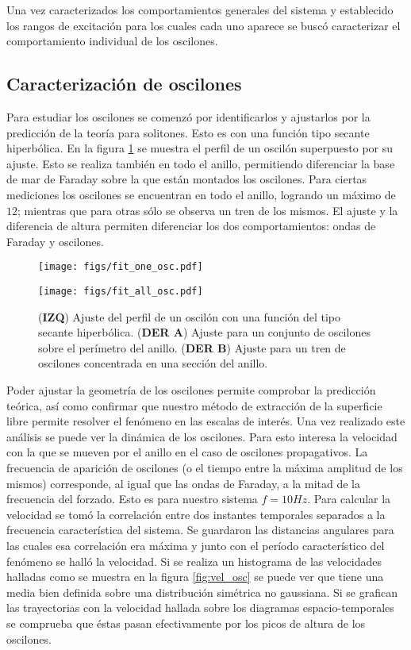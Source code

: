 \documentclass[../main.tex]{subfiles}
\begin{document}
Una vez caracterizados los comportamientos generales del sistema y establecido los rangos de excitación para los cuales cada uno aparece se buscó caracterizar el comportamiento individual de los oscilones. 

\subsection{Caracterización de oscilones}
Para estudiar los oscilones se comenzó por identificarlos y ajustarlos por la predicción de la teoría para solitones. Esto es con una función tipo secante hiperbólica. En la figura  \ref{fig:ajuste_osc} se muestra el perfil de un oscilón superpuesto por su ajuste. Esto se realiza también en todo el anillo, permitiendo diferenciar la base de mar de Faraday sobre la que están montados los oscilones. Para ciertas mediciones los oscilones se encuentran en todo el anillo, logrando un máximo de $12$; mientras que para otras sólo se observa un tren de los mismos. El ajuste y la diferencia de altura permiten diferenciar los dos comportamientos: ondas de Faraday y oscilones. 

\begin{figure}[H]
	\begin{minipage}{0.46\textwidth}
	    \texttt{[image: figs/fit\_one\_osc.pdf]}
	\end{minipage} \hfill
	\begin{minipage}{0.46\textwidth}
	    \texttt{[image: figs/fit\_all\_osc.pdf]}
	\end{minipage}
    \caption{(\textbf{IZQ}) Ajuste del perfil de un oscilón con una función del tipo secante hiperbólica. (\textbf{DER A}) Ajuste para un conjunto de oscilones sobre el perímetro del anillo. (\textbf{DER B}) Ajuste para un tren de oscilones concentrada en una sección del anillo.}
    \label{fig:ajuste_osc}
\end{figure}

Poder ajustar la geometría de los oscilones permite comprobar la predicción teórica, así como confirmar que nuestro método de extracción de la superficie libre permite resolver el fenómeno en las escalas de interés.
Una vez realizado este análisis se puede ver la dinámica de los oscilones. Para esto interesa la velocidad con la que se mueven por el anillo en el caso de oscilones propagativos. La frecuencia de aparición de oscilones (o el tiempo entre la máxima amplitud de los mismos) corresponde, al igual que las ondas de Faraday, a la mitad de la frecuencia del forzado. Esto es para nuestro sistema $f = 10\si{Hz}$. Para calcular la velocidad se tomó la correlación entre dos instantes temporales separados a la frecuencia característica del sistema. Se guardaron las distancias angulares para las cuales esa correlación era máxima y junto con el período característico del fenómeno se halló la velocidad. Si se realiza un histograma de las velocidades halladas como se muestra en la figura \ref{fig:vel_osc} se puede ver que tiene una media bien definida sobre una distribución simétrica no gaussiana. Si se grafican las trayectorias con la velocidad hallada sobre los diagramas espacio-temporales se comprueba que éstas pasan efectivamente por los picos de altura de los oscilones.
\end{document}
